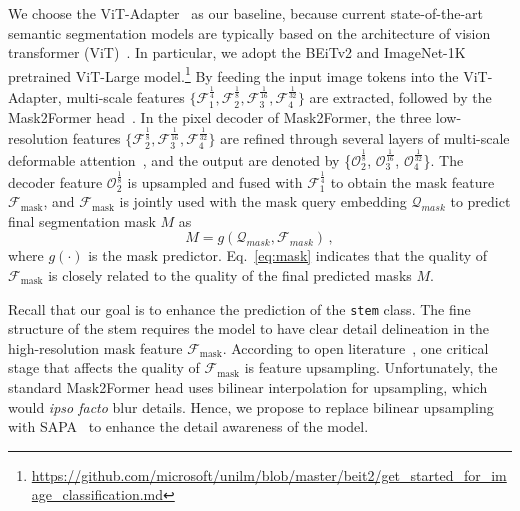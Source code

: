 We choose the ViT-Adapter~\cite{chen2022vision} as our baseline, because current state-of-the-art semantic segmentation models are typically based on the architecture of vision transformer (ViT)~\cite{dosovitskiy2021image}. In particular, we adopt the BEiTv2 and ImageNet-1K pretrained ViT-Large model.\footnote{\url{https://github.com/microsoft/unilm/blob/master/beit2/get_started_for_image_classification.md}} 
By feeding the input image tokens into the ViT-Adapter, multi-scale features $\{\mathcal{F}_1^{\frac{1}{4}},\mathcal{F}_2^{\frac{1}{8}},\mathcal{F}_3^{\frac{1}{16}},\mathcal{F}_4^{\frac{1}{32}} \}$ are extracted, followed by the Mask2Former head~\cite{he2022masked}. In the pixel decoder of Mask2Former, the three low-resolution features $\{\mathcal{F}_2^{\frac{1}{8}},\mathcal{F}_3^{\frac{1}{16}},\mathcal{F}_4^{\frac{1}{32}}\}$ are refined through several layers of multi-scale deformable attention~\cite{xia2022vision}, and the output are denoted by \{$\mathcal{O}_2^\frac{1}{8}$, $\mathcal{O}_3^\frac{1}{16}$, $\mathcal{O}_4^\frac{1}{32}$\}. The decoder feature $\mathcal{O}_2^{\frac{1}{8}}$ is upsampled and fused with $\mathcal{F}_1^{\frac{1}{4}}$ to obtain the mask feature $\mathcal{F}_{\text{mask}}$, and $\mathcal{F}_{\text{mask}}$ is jointly used with the mask query embedding $\mathcal{Q}_{mask}$ to predict final segmentation mask $M$ as
\begin{equation}\label{eq:mask}
    M=g(\mathcal{Q}_{mask},\mathcal{F}_{mask})\,,
\end{equation}
where $g(\cdot)$ is the mask predictor.
Eq.~\eqref{eq:mask} indicates that the quality of $\mathcal{F}_{\text{mask}}$ is %
closely related to %
the quality of the final predicted masks $M$.

Recall that our goal is to enhance the prediction of the \texttt{stem} class. The fine structure of the stem requires the model to have clear detail delineation in the high-resolution mask feature $\mathcal{F}_{\text{mask}}$. According to open literature~\cite{lu2019indices,lu2022index,lu2022fade,lu2022sapa,liu2023learning,lu2025fade}, one critical stage that affects the quality of $\mathcal{F}_{\text{mask}}$ is feature upsampling. Unfortunately, the standard Mask2Former head uses bilinear interpolation for upsampling, which would \textit{ipso facto} blur details. Hence, we propose to replace bilinear upsampling with SAPA~\cite{lu2022sapa} to enhance the detail awareness of the model.

